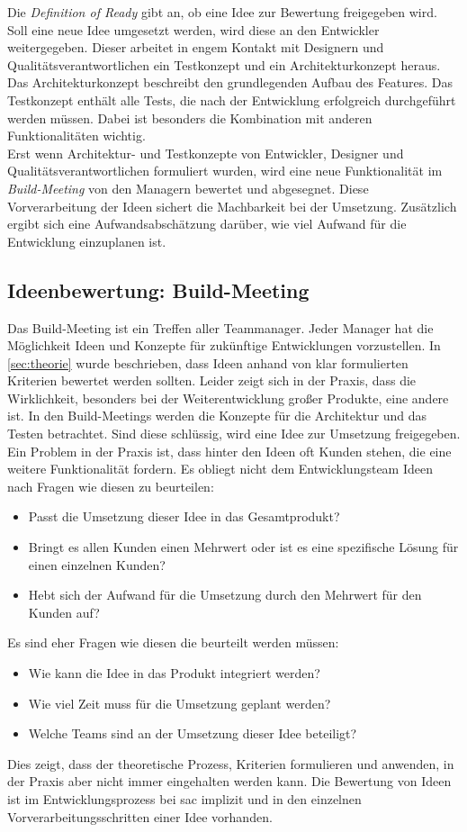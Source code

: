 Die \textit{Definition of Ready} gibt an, ob eine Idee zur Bewertung freigegeben wird.
Soll eine neue Idee umgesetzt werden, wird diese an den Entwickler weitergegeben. Dieser 
arbeitet in engem Kontakt mit Designern und Qualitätsverantwortlichen ein Testkonzept und ein Architekturkonzept heraus. 
Das Architekturkonzept beschreibt den grundlegenden Aufbau des Features. 
Das Testkonzept enthält alle Tests, die nach der Entwicklung erfolgreich durchgeführt werden müssen. Dabei ist besonders die Kombination mit anderen Funktionalitäten 
wichtig. \\
Erst wenn Architektur- und Testkonzepte von Entwickler, Designer und Qualitätsverantwortlichen formuliert wurden, wird eine neue Funktionalität im 
\textit{Build-Meeting} von den Managern bewertet und abgesegnet. Diese Vorverarbeitung der Ideen sichert die Machbarkeit bei der Umsetzung. Zusätzlich ergibt 
sich eine Aufwandsabschätzung darüber, wie viel Aufwand für die Entwicklung einzuplanen ist. 

\subsection{Ideenbewertung: Build-Meeting}
Das Build-Meeting ist ein Treffen aller Teammanager. Jeder Manager hat die Möglichkeit Ideen und Konzepte für zukünftige Entwicklungen 
vorzustellen. In \autoref{sec:theorie} wurde beschrieben, dass Ideen anhand von klar formulierten 
Kriterien bewertet werden sollten. 
Leider zeigt sich in der Praxis, dass die Wirklichkeit, besonders bei der Weiterentwicklung großer Produkte, eine andere ist. 
In den Build-Meetings werden die Konzepte für die Architektur und das Testen betrachtet. Sind diese schlüssig, wird eine Idee zur Umsetzung freigegeben. 
Ein Problem in der Praxis ist, dass hinter den Ideen oft Kunden stehen, die eine weitere Funktionalität fordern. Es obliegt nicht 
dem Entwicklungsteam Ideen nach Fragen wie diesen zu beurteilen: 
\begin{itemize}
    \item Passt die Umsetzung dieser Idee in das Gesamtprodukt?
    \item Bringt es allen Kunden einen Mehrwert oder ist es eine spezifische Lösung für einen einzelnen Kunden?
    \item Hebt sich der Aufwand für die Umsetzung durch den Mehrwert für den Kunden auf?
\end{itemize}
Es sind eher Fragen wie diesen die beurteilt werden müssen: 
\begin{itemize}
    \item Wie kann die Idee in das Produkt integriert werden?
    \item Wie viel Zeit muss für die Umsetzung geplant werden? 
    \item Welche Teams sind an der Umsetzung dieser Idee beteiligt?
\end{itemize}
Dies zeigt, dass der theoretische Prozess, Kriterien formulieren und anwenden, in der Praxis aber nicht immer eingehalten werden kann.
Die Bewertung von Ideen ist im Entwicklungsprozess bei \ac{sac} implizit und in den einzelnen Vorverarbeitungsschritten einer Idee vorhanden.
